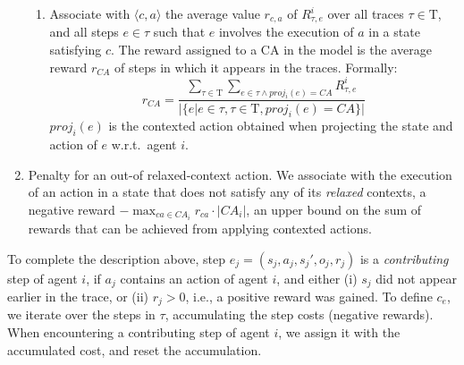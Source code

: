 \documentclass[runningheads]{llncs}
\newcommand{\mcact}[1]{{\mathit{CA}_#1}}
\newcommand{\Tau}{\mathrm{T}}
\begin{document}
\begin{enumerate}
\begin{enumerate}
        \item Associate with $\langle c,a\rangle$ the average value $r_{c,a}$ of $R^i_{\tau,e}$ over all traces $\tau\in\Tau$, and all steps $e\in\tau$ such that $e$ involves the execution of $a$ in a state satisfying $c$.  The reward assigned to a CA in the model is the average reward 
        $r_{CA}$ of steps in which it appears in the traces.
        Formally:
        \begin{equation}
            r_{CA} = \frac{\sum\limits_{\tau\in\Tau} \sum\limits_{e\in\tau \land proj_i(e)=CA} R^i_{\tau,e}}
           {|\{ e|e\in\tau, \tau\in\Tau, proj_i(e)=CA \}|}
        \end{equation}
        $proj_i(e)$ is the  contexted action obtained when projecting the state and action of $e$ w.r.t.~agent $i$.
    \end{enumerate}
    \item Penalty for an out-of relaxed-context action. We associate with the execution of an action in a state that does not satisfy any of its {\em relaxed} contexts, a negative reward $-\max_{ca \in \mcact{i}} r_{ca} \cdot \lvert \mcact{i}\rvert $, an upper bound on the sum of rewards that can be achieved from applying contexted actions. 

\end{enumerate}







To complete the description above, step $e_j=(s_j,a_j,s_j',o_j,r_j)$ is
a \emph{contributing} step of agent $i$, if $a_j$ contains an action of agent $i$, 
and either (i) $s_j$ did not appear earlier in the trace, or (ii) $r_j>0$, i.e., a positive reward was gained.
To define $c_e$, we iterate over the steps in $\tau$, accumulating the step costs (negative rewards). When encountering a contributing step of agent $i$, we assign it with the accumulated cost, and reset the accumulation.
\end{document}
